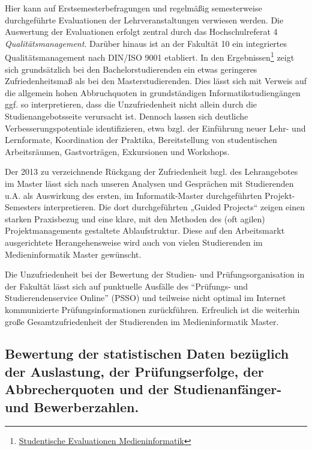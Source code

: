 Hier kann auf Erstsemesterbefragungen und regelmäßig semesterweise
durchgeführte Evaluationen der Lehrveranstaltungen verwiesen werden. Die
Auswertung der Evaluationen erfolgt zentral durch das Hochschulreferat 4
\emph{Qualitätsmanagement}. Darüber hinaus ist an der Fakultät 10 ein
integriertes Qualitätsmanagement nach DIN/ISO 9001 etabliert. In den
Ergebnissen\footnote{\href{../anhaenge/evaluationen-f10.pdf}{Studentische
  Evaluationen Medieninformatik}} zeigt sich grundsätzlich bei den
Bachelorstudierenden ein etwas geringeres Zufriedenheitsmaß als bei den
Masterstudierenden. Dies lässt sich mit Verweis auf die allgemein hohen
Abbruchquoten in grundständigen Informatikstudiengängen ggf. so
interpretieren, dass die Unzufriedenheit nicht allein durch die
Studienangebotsseite verursacht ist. Dennoch lassen sich deutliche
Verbesserungspotentiale identifizieren, etwa bzgl. der Einführung neuer
Lehr- und Lernformate, Koordination der Praktika, Bereitstellung von
studentischen Arbeitsräumen, Gastvorträgen, Exkursionen und Workshops.

Der 2013 zu verzeichnende Rückgang der Zufriedenheit bzgl. des
Lehrangebotes im Master lässt sich nach unseren Analysen und Gesprächen
mit Studierenden u.A. als Auswirkung des ersten, im Informatik-Master
durchgeführten Projekt-Semesters interpretieren. Die dort durchgeführten
„Guided Projects`` zeigen einen starken Praxisbezug und eine klare, mit
den Methoden des (oft agilen) Projektmanagements gestaltete
Ablaufstruktur. Diese auf den Arbeitsmarkt ausgerichtete
Herangehensweise wird auch von vielen Studierenden im Medieninformatik
Master gewünscht.

Die Unzufriedenheit bei der Bewertung der Studien- und
Prüfungsorganisation in der Fakultät lässt sich auf punktuelle Ausfälle
des ``Prüfungs- und Studierendenservice Online'' (PSSO) und teilweise
nicht optimal im Internet kommunizierte Prüfungsinformationen
zurückführen. Erfreulich ist die weiterhin große Gesamtzufriedenheit der
Studierenden im Medieninformatik Master.

\subsection{Bewertung der statistischen Daten bezüglich der
Auslastung, der Prüfungserfolge, der Abbrecherquoten und der
Studienanfänger- und
Bewerberzahlen.}\label{bewertung-der-statistischen-daten-bezuxfcglich-der-auslastung-der-pruxfcfungserfolge-der-abbrecherquoten-und-der-studienanfuxe4nger--und-bewerberzahlen.}


